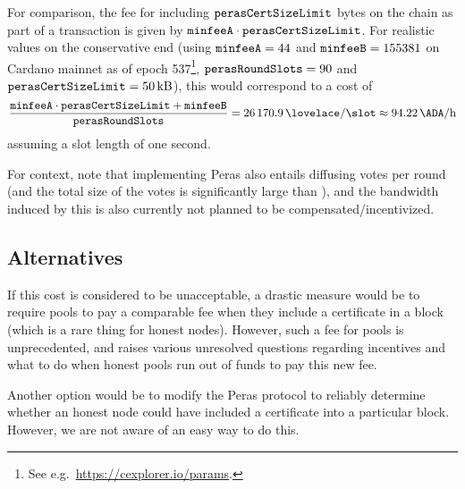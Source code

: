 For comparison, the fee for including $\mathtt{perasCertSizeLimit}$ bytes on the chain as part of a transaction is given by $\mathtt{minfeeA}\cdot \mathtt{perasCertSizeLimit}$.
For realistic values on the conservative end (using $\mathtt{minfeeA} = 44$ and $\mathtt{minfeeB} = 155381$ on Cardano mainnet as of epoch 537\footnote{See e.g.\ \url{https://cexplorer.io/params}.}, $\mathtt{perasRoundSlots}=90$ and $\mathtt{perasCertSizeLimit} = \SI{50}{kB}$), this would correspond to a cost of
\[ \frac{\mi{minfeeA\cdot \perasCertSizeLimit + \mi{minfeeB}}}{\perasRoundSlots} = \SI{26170.9}{\lovelace/\slot} \approx \SI{94.22}{\ADA/h} \]
assuming a slot length of one second.

For context, note that implementing Peras also entails diffusing \perasN{} votes per round (and the total size of the votes is significantly large than \perasCertSizeLimit{}), and the bandwidth induced by this is also currently not planned to be compensated/incentivized.

\subsection{Alternatives}
If this cost is considered to be unacceptable, a drastic measure would be to require pools to pay a comparable fee when they include a certificate in a block (which is a rare thing for honest nodes).
However, such a fee for pools is unprecedented, and raises various unresolved questions regarding incentives and what to do when honest pools run out of funds to pay this new fee.

Another option would be to modify the Peras protocol to reliably determine whether an honest node could have included a certificate into a particular block.
However, we are not aware of an easy way to do this.


